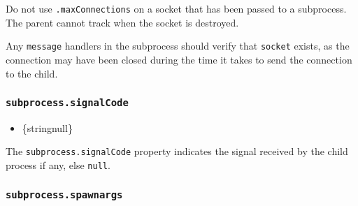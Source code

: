 \begin{Shaded}
\begin{Highlighting}[]
\NormalTok{(}\OperatorTok{,}\OperatorTok{,}\KeywordTok{=\textgreater{}}\NormalTok{ \{}
  \OperatorTok{===} \NormalTok{) \{}
\NormalTok{(}\SpecialCharTok{$\{}\NormalTok{[}\NormalTok{]}\SpecialCharTok{\}}\NormalTok{)}\OperatorTok{;}
\NormalTok{    \}}
\NormalTok{  \}}
\NormalTok{\})}\OperatorTok{;}
\end{Highlighting}
\end{Shaded}

Do not use \texttt{.maxConnections} on a socket that has been passed to
a subprocess. The parent cannot track when the socket is destroyed.

Any \texttt{\textquotesingle{}message\textquotesingle{}} handlers in the
subprocess should verify that \texttt{socket} exists, as the connection
may have been closed during the time it takes to send the connection to
the child.

\subsubsection{\texorpdfstring{\texttt{subprocess.signalCode}}{subprocess.signalCode}}\label{subprocess.signalcode}

\begin{itemize}
\tightlist
\item
  \{string\textbar null\}
\end{itemize}

The \texttt{subprocess.signalCode} property indicates the signal
received by the child process if any, else \texttt{null}.

\subsubsection{\texorpdfstring{\texttt{subprocess.spawnargs}}{subprocess.spawnargs}}\label{subprocess.spawnargs}

